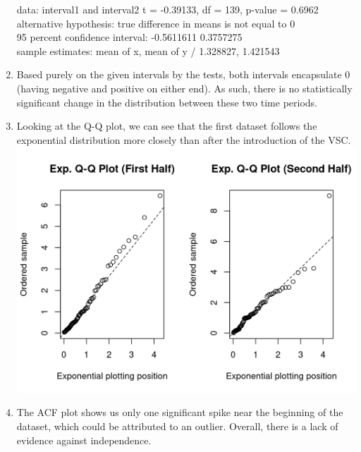 \documentclass{article}
\begin{document}
\begin{enumerate}
          data:  interval1 and interval2
          t = -0.39133, df = 139, p-value = 0.6962 \\
          alternative hypothesis: true difference in means is not equal to 0 \\
          95 percent confidence interval:
          -0.5611611  0.3757275 \\
          sample estimates:
          mean of x, mean of y /
          1.328827, 1.421543
    \item Based purely on the given intervals by the tests, both intervals encapsulate 0 (having negative and positive on either end). As such, there is no statistically significant change in the distribution between these two time periods. \addtocounter{enumi}{1}
    \item
          \setlength{\columnsep}{0.4cm}
          \begin{multicols}{2}
              Looking at the Q-Q plot, we can see that the first dataset follows the exponential distribution more closely than after the introduction of the VSC.
              \\
              \includegraphics[scale=0.5]{q-qplot.png}
          \end{multicols}
    \item
          \begin{multicols}{2}
              The ACF plot shows us only one significant spike near the beginning of the dataset, which could be attributed to an outlier. Overall, there is a lack of evidence against independence. \\

\end{multicols}
\end{enumerate}
\end{document}
